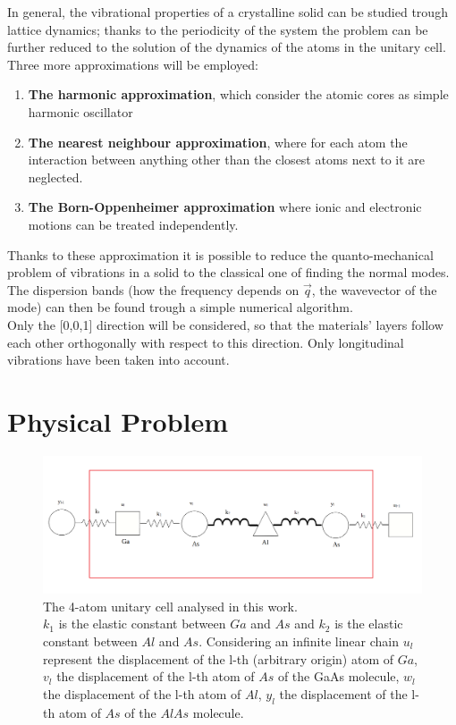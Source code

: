 \documentclass{article}
\begin{document}
In general, the vibrational properties of a crystalline solid can be studied trough lattice dynamics; thanks to the periodicity of the system the problem can be further reduced to the solution of the dynamics of the atoms in the unitary cell.\\
	Three more approximations will be employed:
	\begin{enumerate}
		\item \textbf{The harmonic approximation}, which consider the atomic cores as simple harmonic oscillator
		\item \textbf{The nearest neighbour approximation}, where for each atom the interaction between anything other than the closest atoms next to it are neglected.
		\item \textbf{The Born-Oppenheimer approximation} where ionic and electronic motions can be treated independently.
	\end{enumerate}
	Thanks to these approximation it is possible to reduce the quanto-mechanical problem of vibrations in a solid to the classical one of finding the normal modes. The dispersion bands (how the frequency depends on $\vec{q}$, the wavevector of the mode) can then be found trough a simple numerical algorithm.\\
Only the [0,0,1] direction will be considered, so that the materials' layers follow each other orthogonally with respect to this direction. Only longitudinal vibrations have been taken into account. \\

	\section{Physical Problem}

\begin{figure}
	\centering
	\includegraphics[width=0.7\linewidth]{cella.png}
	\caption{The 4-atom unitary cell analysed in this work.\\
	$k_1$ is the elastic constant between $Ga$ and $As$ and $k_2$ is the elastic constant between $Al$ and $As$. Considering an infinite linear chain $u_l$ represent the displacement of the l-th (arbitrary origin) atom of $Ga$, $v_l$ the displacement of the l-th atom of $As$ of the GaAs molecule, $w_l$ the displacement of the l-th atom of $Al$, $y_l$ the displacement of the l-th atom of $As$ of the $AlAs$ molecule.   }
	\label{fig:cella}
\end{figure}
\end{document}
